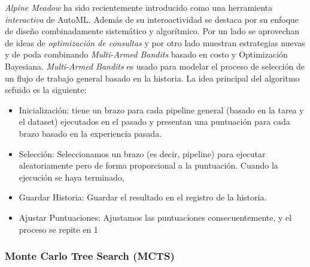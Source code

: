 \textit{Alpine Meadow} \cite{shang2019democratizing} ha sido recientemente introducido como una herramienta \emph{interactiva} de AutoML. Además de su interoactividad se destaca por su enfoque de diseño combinadamente sistemático y algorítmico. Por un lado se aprovechan de ideas de \textit{optimización de consultas} y por otro lado muestran estrategias nuevas y de poda combinando \textit{Multi-Armed Bandits} basado en costo y Optimización Bayesiana. \textit{Multi-Armed Bandits} es usado para modelar el proceso de selección de un flujo de trabajo general basado en la historia. La idea principal del algoritmo sefuido es la siguiente:
\begin{itemize}
	\item Inicialización: tiene un brazo para cada pipeline general (basado en la tarea y el dataset) ejecutados en el pasado y presentan una puntuación para cada brazo basado en la experiencia pasada.
	\item Selección: Seleccionamos un brazo (es decir, pipeline) para ejecutar aleatoriamente pero de forma proporcional a la puntuación. Cuando la ejecución se haya terminado,
	\item Guardar Historia: Guardar el resultado en el registro de la historia.
	\item Ajustar Puntuaciones: Ajustamos las puntuaciones consecuentemente, y el proceso se repite en 1
\end{itemize}


\subsubsection{Monte Carlo Tree Search (MCTS)}


